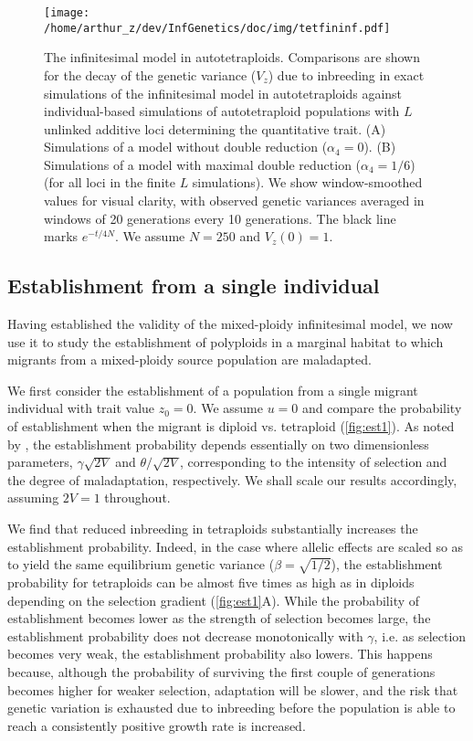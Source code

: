 \documentclass[11pt,a4paper]{article}
\begin{document}
\begin{figure}[t]
\centering
\texttt{[image: /home/arthur\_z/dev/InfGenetics/doc/img/tetfininf.pdf]}
\caption{
The infinitesimal model in autotetraploids.
Comparisons are shown for the decay of the genetic variance ($V_z$) due to
inbreeding in exact simulations of the infinitesimal model in autotetraploids
against individual-based simulations of autotetraploid populations with $L$
unlinked additive loci determining the quantitative trait. 
(A) Simulations of a model without double reduction ($\alpha_4=0$).
(B) Simulations of a model with maximal double reduction ($\alpha_4=1/6$) (for
all loci in the finite $L$ simulations).
We show window-smoothed values for visual clarity, with observed genetic
variances averaged in windows of 20 generations every 10 generations.
The black line marks $e^{-t/4N}$. 
We assume $N=250$ and $V_z(0) = 1$.
\label{fig:vztet}}
\end{figure}


\subsection*{Establishment from a single individual}

Having established the validity of the mixed-ploidy infinitesimal model, we now
use it to study the establishment of polyploids in a marginal habitat to which
migrants from a mixed-ploidy source population are maladapted.

We first consider the establishment of a population from a single migrant
individual with trait value $z_0 = 0$.
We assume $u=0$ and compare the probability of establishment when the migrant
is diploid vs. tetraploid (\cref{fig:est1}).
As noted by \cite{barton2018}, the establishment probability depends
essentially on two dimensionless parameters, $\gamma\sqrt{2V}$ and
$\theta/\sqrt{2V}$, corresponding to the intensity of selection and the degree of
maladaptation, respectively.
We shall scale our results accordingly, assuming $2V=1$ throughout.

We find that reduced inbreeding in tetraploids substantially increases the
establishment probability.
Indeed, in the case where allelic effects are scaled so as to yield the same
equilibrium genetic variance ($\beta = \sqrt{1/2}$), the establishment probability 
for tetraploids can be almost five times as high as in diploids depending on
the selection gradient (\cref{fig:est1}A).
While the probability of establishment becomes lower as the strength of
selection becomes large, the establishment probability does not decrease
monotonically with $\gamma$, i.e. as selection becomes very weak, the
establishment probability also lowers.
This happens because, although the probability of surviving the first couple of
generations becomes higher for weaker selection, adaptation will be slower, and
the risk that genetic variation is exhausted due to inbreeding before the
population is able to reach a consistently positive growth rate is increased.
\end{document}
